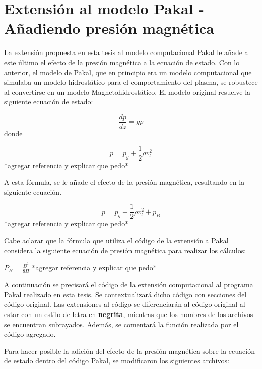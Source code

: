 \chapter{Extensi\'on al modelo Pakal \-- A\~nadiendo presi\'on magn\'etica}

La extensi\'on propuesta en esta tesis al modelo computacional Pakal le a\~nade a este \'ultimo el efecto de la presi\'on magn\'etica a la ecuaci\'on de estado. Con lo anterior, el modelo de Pakal, que en principio era un modelo computacional que simulaba un modelo hidrost\'atico para el comportamiento del plasma, se robustece al convertirse en un modelo Magnetohidrost\'atico. El modelo original resuelve la siguiente ecuaci\'on de estado:

\begin{equation*} \label{ecuacion_hidrostatica}
\frac{dp}{dz} = g\rho
\end{equation*}
donde

\begin{equation*} \label{ecuacion_presion}
p = p_g + \frac{1}{2}\rho v_t^2
\end{equation*}
*agregar referencia y explicar que pedo*

A esta f\'ormula, se le a\~nade el efecto de la presi\'on magn\'etica, resultando en la siguiente ecuaci\'on\citep{priest}.

\begin{equation*} \label{mhs}
p = p_g + \frac{1}{2}\rho v_t^2 + p_B
\end{equation*}
*agregar referencia y explicar que pedo*

Cabe aclarar que la f\'ormula que utiliza el c\'odigo de la extensi\'on a Pakal considera la siguiente ecuaci\'on de presi\'on magn\'etica para realizar los c\'alculos:

$P_B = \frac{B^2}{8\Pi}$
*agregar referencia y explicar que pedo*

A continuaci\'on se precisar\'a el c\'odigo de la extensi\'on computacional al programa Pakal realizado en esta tesis. Se contextualizar\'a dicho c\'odigo con secciones del c\'odigo original. Las extensiones al c\'odigo se diferenciar\'an al c\'odigo original al estar con un estilo de letra en \textbf{negrita}, mientras que los nombres de los archivos se encuentran \underline{subrayados}. Adem\'as, se comentar\'a la funci\'on realizada por el c\'odigo agregado. 

Para hacer posible la adici\'on del efecto de la presi\'on magn\'etica sobre la ecuaci\'on de estado dentro del c\'odigo Pakal, se modificaron los siguientes archivos:\newline

